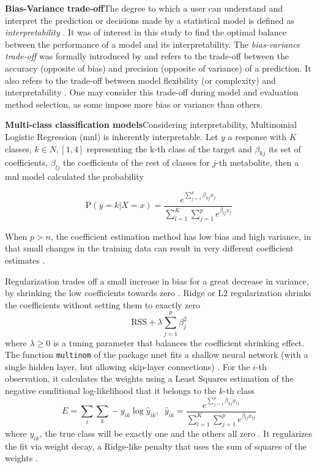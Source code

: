 \documentclass{amsart}
\begin{document}
\leavevmode\newline \textbf{Bias-Variance trade-off}\hspace{.25cm}The degree to which a user can understand and interpret the prediction or decisions made by a statistical model is defined as \textit{interpretability} \cite{Elshawi2019OnHypertension}. It was of interest in this study to find the optimal balance between the performance of a model and its interpretability. The \textit{bias-variance trade-off} was formally introduced by \citeauthor{Geman1992NeuralDilemma} and refers to the trade-off between the accuracy (opposite of bias) and precision (opposite of variance) of a prediction. It also refers to the trade-off between model flexibility (or complexity) and interpretability \cite{Geman1992NeuralDilemma}. One may consider this trade-off during model and evaluation method selection, as some impose more bias or variance than others.

\leavevmode\newline \textbf{Multi-class classification models}\hspace{.25cm}Considering interpretability, Multinomial Logistic Regression (\acrshort{mnl}) is inherently interpretable. Let $y$ a response with $K$ classes, $k \in N, [1,4]$ representing the k-th class of the target and $\beta_{kj}$ its set of coefficients,  $\beta_{lj}$ the coefficients of the rest of classes for $j$-th metabolite, then a \acrlong{mnl} model calculated the probability

\[\textrm{P}(y=k|X=x) =  \dfrac{e^{\sum_{j=1}^{p}\beta_{kj}x_j}}{\sum_{l=1}^{K}\sum_{j=1}^{p}e^{\beta_{lj}x_j}}\]

When $p > n$, the coefficient estimation method has low bias and high variance, in that small changes in the training data can result in very different coefficient estimates \cite{James2023AnEdition}. 

Regularization trades off a small increase in bias for a great decrease in variance, by shrinking the low coefficients towards zero \cite{James2023AnEdition}. Ridge or L2 regularization \cite{Cessie1992RidgeRegression} shrinks the coefficients without setting them to exactly zero \cite{Cessie1992RidgeRegression}
\[\textrm{RSS} + \lambda\sum_{j=1}^{p}\beta_j^2 \]where $\lambda \geq 0$ is a tuning parameter that balances the coefficient shrinking effect. The function \texttt{multinom} of the package \textsf{nnet} fits a shallow neural network (with a single hidden layer, but allowing skip-layer connections) \cite{nnet}. For the $i$-th observation, it calculates the weights using a Least Squares estimation of the negative conditional log-likelihood that it belongs to the $k$-th class
\[E = \sum_{i}\sum_{k}-y_{ik}\log\hat{y}_{ik}, \; \;  \hat{y}_{ik} =  \dfrac{e^{\sum_{j=1}^{p}\beta_{kj}x_{ij}}}{\sum_{l=1}^{K}\sum_{j=1}^{p}e^{\beta_{lj}x_{ij}}}\]
where $y_{ik}$, the true class will be exactly one and the others all zero \cite{nnet}. It regularizes the fit via weight decay, a Ridge-like penalty that uses the sum of squares of the weights \cite{nnet}.
\end{document}
